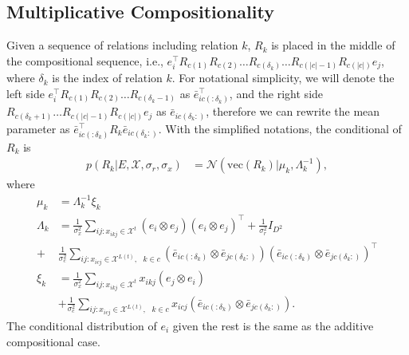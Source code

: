\subsection{Multiplicative Compositionality}
\label{sec:mult_comp_posterior}
Given a sequence of relations including relation $k$, $R_k$ is placed in the middle of the compositional
sequence, i.e., $e_i^\top R_{c(1)}R_{c(2)} \dots R_{c(\delta_k)} \dots R_{c(|c|-1)}R_{c(|c|)} e_j$, where $
\delta_k$ is the index of relation $k$. For notational simplicity, we will denote the left side $e_i^\top R_{c(1)}
R_{c(2)} \dots R_{c(\delta_k -1)}$ as $\bar{e}_{ic(:\delta_k)}^\top$, and the right side $R_{c(\delta_k + 1)} \dots
R_{c(|c|-1)}R_{c(|c|)} e_j$ as $\bar{e}_{ic(\delta_k:)}$, therefore we can rewrite the mean parameter as $
\bar{e}_{ic(:\delta_k)}^\top R_{k} \bar{e}_{ic(\delta_k:)}$. With the simplified notations, the conditional of $R_k$
is
\begin{align}
p(R_k|E, \mathcal{X}, \sigma_r, \sigma_x)  &= \mathcal{N}(\text{vec}(R_k) | \mu_k, \Lambda_k^{-1}),
\end{align}
where
\begin{align*}
\mu_k &= \Lambda_k^{-1}\xi_k \\
\Lambda_k &= \frac{1}{\sigma_x^2} \sum_{ij:x_{ikj} \in \mathcal{X}^{t}} (e_i \otimes e_j)(e_i \otimes e_j)^\top +
\frac{1}{\sigma_r^2} {I}_{D^2} \\
+ &\frac{1}{\sigma_c^2} \sum_{ij:x_{icj} \in \mathcal{X}^{L(t)}, \text{ }k \in c} (\bar{e}_{ic(:\delta_k)} \otimes
\bar{e}_{jc(\delta_k:)})(\bar{e}_{ic(:\delta_k)} \otimes \bar{e}_{jc(\delta_k:)} )^\top \\
\xi_k &= \frac{1}{\sigma_x^2} \sum_{ij:x_{ikj} \in \mathcal{X}^{t}} x_{ikj} (e_{j} \otimes e_{i}) \\
& + \frac{1}{\sigma_c^2} \sum_{ij:x_{icj} \in \mathcal{X}^{L(t)}, \text{ }k\in c} x_{icj} (\bar{e}_{ic(:\delta_k)}
\otimes \bar{e}_{jc(\delta_k:)}).
\end{align*}
The conditional distribution of $e_i$ given the rest is the same as the additive compositional case.

